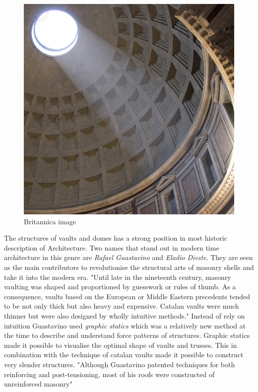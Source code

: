 \begin{figure}[H]
\centering
\includegraphics[width=0.9\linewidth ]{figure/Introduction/Pantheon1.jpg}
\caption{Britannica image}
\end{figure}


The structures of vaults and domes has a strong position in most historic description of Architecture. Two names that stand out in modern time architecture in this genre are \textit{Rafael Guastavino} and \textit{Eladio Dieste}. They are seen as the main contributors to revolutionise the structural arts of masonry shells and take it into the modern era. 
"Until late in the nineteenth century, masonry vaulting was shaped and proportioned by guesswork or rules of thumb. As a consequence, vaults based on the European or Middle Eastern precedents tended to be not only thick but also heavy and expensive. Catalan vaults were much thinner but were also designed by wholly intuitive methods."
Instead of rely on intuition Guastavino used \textit{graphic statics} which was a relatively new method at the time to describe and understand force patterns of structures. Graphic statics made it possible to visualise the optimal shape of vaults and trusses. This in combination with the technique of catalan vaults made it possible to construct very slender structures. "Although Guastavino patented techniques for both reinforcing and post-tensioning, most of his roofs were constructed of unreinforced masonry"





